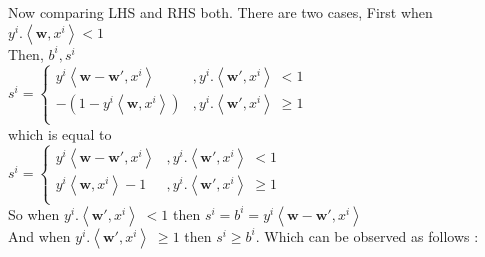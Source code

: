 \documentclass[a4paper,11pt]{article}
\begin{document}
\begin{mlsolution}
Now comparing LHS and RHS both. There are two cases, First when \begin{math}y^{i}.\left \langle \textbf{w}, x^{i} \right \rangle < 1 \end{math}\\

Then, \begin{math}b^{i}, s^{i}\end{math}\\

\begin{math}
s^{i} = \left\{\begin{matrix}
y^{i} \left \langle \textbf{w} -\textbf{w}{}', x^{i}\right \rangle & ,y^{i}.\left \langle \textbf{w}{}', x^{i} \right \rangle \; <  1\\ 
- \left ( 1 - y^{i}\left \langle \textbf{w}, x^{i}\right \rangle \right ) & ,y^{i}.\left \langle \textbf{w}{}', x^{i}\right \rangle \; \geq  1\\ 

\end{matrix}\right.
\end{math}\\

which is equal to \\

\begin{math}
s^{i} = \left\{\begin{matrix}
y^{i} \left \langle \textbf{w} -\textbf{w}{}', x^{i} \right \rangle & ,y^{i}.\left \langle \textbf{w}{}', x^{i}\right \rangle \; <  1\\ 
y^{i}\left \langle \textbf{w}, x^{i}\right \rangle -1 & ,y^{i}.\left \langle \textbf{w}{}', x^{i}\right \rangle \; \geq  1\\ 

\end{matrix}\right.
\end{math}\\

So when \begin{math}y^{i}.\left \langle \textbf{w}{}', x^{i} \right \rangle \; <  1\end{math} then \; \begin{math} s^{i} = b^{i} = y^{i} \left \langle \textbf{w} -\textbf{w}{}', x^{i} \right \rangle \end{math} \\

And when \begin{math}y^{i}.\left \langle \textbf{w}{}', x^{i} \right \rangle \; \geq  1\end{math}
 then \; \begin{math} s^{i} \geq b^{i}\end{math}. Which can be observed as follows :
 

\end{mlsolution}
\end{document}
